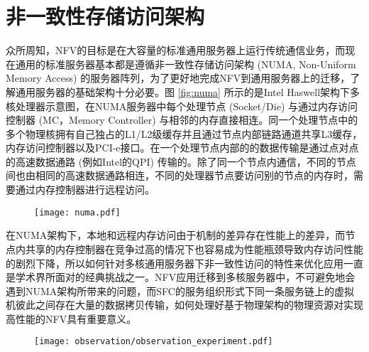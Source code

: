 \section{非一致性存储访问架构}
\label{sec:numa}
众所周知，NFV的目标是在大容量的标准通用服务器上运行传统通信业务，而现在通用的标准服务器基本都是遵循非一致性存储访问架构 (NUMA, Non-Uniform Memory Access) 的服务器阵列，为了更好地完成NFV到通用服务器上的迁移，了解通用服务器的基础架构十分必要。图 \ref{fig:numa} 所示的是Intel Haswell架构下多核处理器示意图，在NUMA服务器中每个处理节点 (Socket/Die) 与通过内存访问控制器 (MC，Memory Controller) 与相邻的内存直接相连。同一个处理节点中的多个物理核拥有自己独占的L1/L2级缓存并且通过节点内部链路通道共享L3缓存，内存访问控制器以及PCI-e接口。在一个处理节点内部的的数据传输是通过点对点的高速数据通路 (例如Intel的QPI) 传输的。除了同一个节点内通信，不同的节点间也由相同的高速数据通路相连，不同的处理器节点要访问别的节点的内存时，需要通过内存控制器进行远程访问。
\begin{figure}[!htp]
	\centering
	\texttt{[image: numa.pdf]}
\end{figure}
在NUMA架构下，本地和远程内存访问由于机制的差异存在性能上的差异，而节点内共享的内存控制器在竞争过高的情况下也容易成为性能瓶颈导致内存访问性能的剧烈下降，所以如何针对多核通用服务器下非一致性访问的特性来优化应用一直是学术界所面对的经典挑战之一。NFV应用迁移到多核服务器中，不可避免地会遇到NUMA架构所带来的问题，而SFC的服务组织形式下同一条服务链上的虚拟机彼此之间存在大量的数据拷贝传输，如何处理好基于物理架构的物理资源对实现高性能的NFV具有重要意义。

\begin{figure}[!htp]
	\centering
	\texttt{[image: observation/observation\_experiment.pdf]}
\end{figure}
\begin{figure}[!htp]
	\centering
\end{figure}
